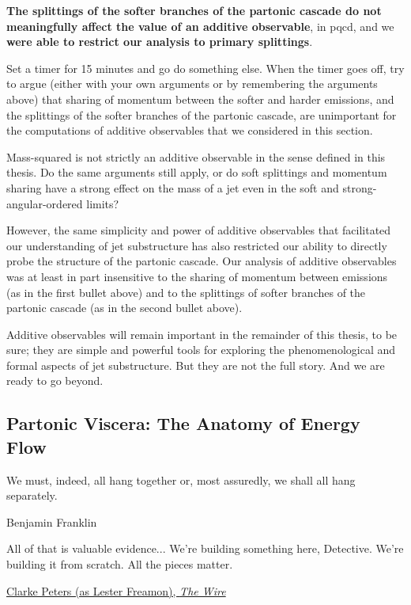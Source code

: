 \begin{itemize}
         \textbf{The splittings of the softer branches of the partonic cascade do not meaningfully affect the value of an additive observable}, in \gls{pqcd}, and we \textbf{were able to restrict our analysis to primary splittings}.
\end{itemize}

\begin{exercise}
    Set a timer for 15 minutes and go do something else.
    When the timer goes off, try to argue (either with your own arguments or by remembering the arguments above) that sharing of momentum between the softer and harder emissions, and the splittings of the softer branches of the partonic cascade, are unimportant for the computations of additive observables that we considered in this section.

    Mass-squared is not strictly an additive observable in the sense defined in this thesis.
    Do the same arguments still apply, or do soft splittings and momentum sharing have a strong effect on the mass of a jet even in the soft and strong-angular-ordered limits?
\end{exercise}


However, the same simplicity and power of additive observables that facilitated our understanding of jet substructure has also restricted our ability to directly probe the structure of the partonic cascade.
%
Our analysis of additive observables was at least in part insensitive to the sharing of momentum between emissions (as in the first bullet above) and to the splittings of softer branches of the partonic cascade (as in the second bullet above).


Additive observables will remain important in the remainder of this thesis, to be sure;
%
they are simple and powerful tools for exploring the phenomenological and formal aspects of jet substructure.
%
But they are not the full story.
%
And we are ready to go beyond.




\subsection{Partonic Viscera: The Anatomy of Energy Flow}
\label{sec:p2p-fragmentation}

\epigraph{We must, indeed, all hang together or, most assuredly, we shall all hang separately.}{Benjamin Franklin}

\epigraph{All of that is valuable evidence... We're building something here, Detective. We're building it from scratch. All the pieces matter.}{\href{https://youtu.be/lgRxFFmr538?t=18}{Clarke Peters (as Lester Freamon), \textit{The Wire}}}




